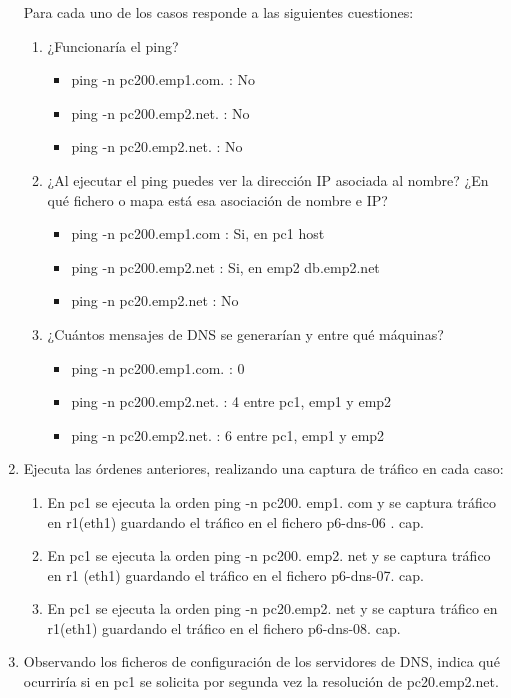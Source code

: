 \documentclass[12pt, a4paper]{report}
\begin{document}
\begin{enumerate}
	Para cada uno de los casos responde a las siguientes cuestiones:
	\begin{enumerate}[label=\alph*]
		\item ¿Funcionaría el ping?
		\begin{itemize}
			\item ping -n pc200.emp1.com. : No
			\item ping -n pc200.emp2.net. : No
			\item ping -n pc20.emp2.net. : No
		\end{itemize}
		\item ¿Al ejecutar el ping puedes ver la dirección IP asociada al nombre? ¿En qué fichero o mapa está esa asociación de nombre e IP?
		\begin{itemize}
			\item ping -n pc200.emp1.com : Si, en pc1 host
			\item ping -n pc200.emp2.net : Si, en emp2 db.emp2.net
			\item ping -n pc20.emp2.net : No
		\end{itemize}
		\item ¿Cuántos mensajes de DNS se generarían y entre qué máquinas?
		\begin{itemize}
			\item ping -n pc200.emp1.com. : 0
			\item ping -n pc200.emp2.net. : 4 entre pc1, emp1 y emp2
			\item ping -n pc20.emp2.net. : 6 entre pc1, emp1 y emp2
		\end{itemize}
	\end{enumerate}


  \item Ejecuta las órdenes anteriores, realizando una captura de tráfico en cada caso:
  \begin{enumerate}[label=\alph*]
  	\item En pc1 se ejecuta la orden ping -n pc200. emp1. com y se captura tráfico en r1(eth1) guardando el tráfico en el fichero p6-dns-06 . cap.
  	\item En pc1 se ejecuta la orden ping -n pc200. emp2. net y se captura tráfico en r1 (eth1) guardando el tráfico en el fichero p6-dns-07. cap.
  	\item En pc1 se ejecuta la orden ping -n pc20.emp2. net y se captura tráfico en r1(eth1) guardando el tráfico en el fichero p6-dns-08. cap.
  \end{enumerate}

  \item Observando los ficheros de configuración de los servidores de DNS, indica qué ocurriría si en pc1 se solicita por segunda vez la resolución de pc20.emp2.net.
  

\end{enumerate}
\end{document}
